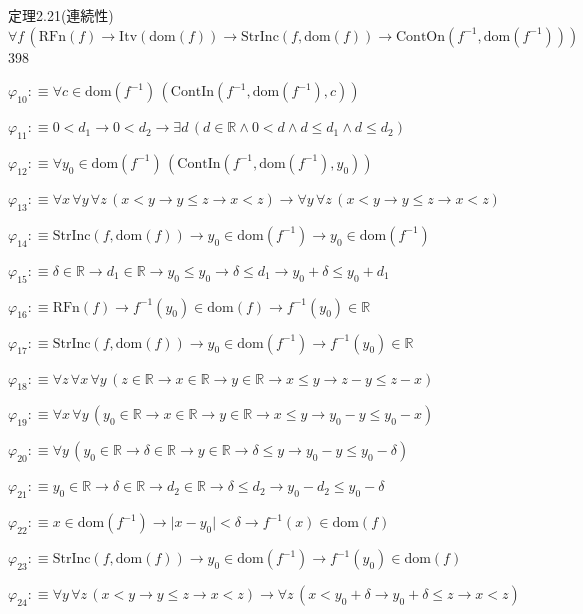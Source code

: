 \begin{fullproof}{定理2.21(連続性)}{$\forall f\,(\mathrm{RFn}(f) \to \mathrm{Itv}(\mathrm{dom}(f)) \to \mathrm{StrInc}(f,\mathrm{dom}(f)) \to \mathrm{ContOn}(f^{-1},\mathrm{dom}(f^{-1})))$}{398}
\begin{abbrevlist}
\item $\varphi_{10} :\equiv \forall c \in \mathrm{dom}(f^{-1})\,(\mathrm{ContIn}(f^{-1},\mathrm{dom}(f^{-1}),c))$
\item $\varphi_{11} :\equiv 0 < d_{1} \to 0 < d_{2} \to \exists d\,(d \in \mathbb{R} \land 0 < d \land d \leq d_{1} \land d \leq d_{2})$
\item $\varphi_{12} :\equiv \forall y_{0} \in \mathrm{dom}(f^{-1})\,(\mathrm{ContIn}(f^{-1},\mathrm{dom}(f^{-1}),y_{0}))$
\item $\varphi_{13} :\equiv \forall x\,\forall y\,\forall z\,(x < y \to y \leq z \to x < z) \to \forall y\,\forall z\,(x < y \to y \leq z \to x < z)$
\item $\varphi_{14} :\equiv \mathrm{StrInc}(f,\mathrm{dom}(f)) \to y_{0} \in \mathrm{dom}(f^{-1}) \to y_{0} \in \mathrm{dom}(f^{-1})$
\item $\varphi_{15} :\equiv \delta \in \mathbb{R} \to d_{1} \in \mathbb{R} \to y_{0} \leq y_{0} \to \delta \leq d_{1} \to y_{0} + \delta \leq y_{0} + d_{1}$
\item $\varphi_{16} :\equiv \mathrm{RFn}(f) \to f^{-1}(y_{0}) \in \mathrm{dom}(f) \to f^{-1}(y_{0}) \in \mathbb{R}$
\item $\varphi_{17} :\equiv \mathrm{StrInc}(f,\mathrm{dom}(f)) \to y_{0} \in \mathrm{dom}(f^{-1}) \to f^{-1}(y_{0}) \in \mathbb{R}$
\item $\varphi_{18} :\equiv \forall z\,\forall x\,\forall y\,(z \in \mathbb{R} \to x \in \mathbb{R} \to y \in \mathbb{R} \to x \leq y \to z - y \leq z - x)$
\item $\varphi_{19} :\equiv \forall x\,\forall y\,(y_{0} \in \mathbb{R} \to x \in \mathbb{R} \to y \in \mathbb{R} \to x \leq y \to y_{0} - y \leq y_{0} - x)$
\item $\varphi_{20} :\equiv \forall y\,(y_{0} \in \mathbb{R} \to \delta \in \mathbb{R} \to y \in \mathbb{R} \to \delta \leq y \to y_{0} - y \leq y_{0} - \delta)$
\item $\varphi_{21} :\equiv y_{0} \in \mathbb{R} \to \delta \in \mathbb{R} \to d_{2} \in \mathbb{R} \to \delta \leq d_{2} \to y_{0} - d_{2} \leq y_{0} - \delta$
\item $\varphi_{22} :\equiv x \in \mathrm{dom}(f^{-1}) \to \lvert x - y_{0} \rvert < \delta \to f^{-1}(x) \in \mathrm{dom}(f)$
\item $\varphi_{23} :\equiv \mathrm{StrInc}(f,\mathrm{dom}(f)) \to y_{0} \in \mathrm{dom}(f^{-1}) \to f^{-1}(y_{0}) \in \mathrm{dom}(f)$
\item $\varphi_{24} :\equiv \forall y\,\forall z\,(x < y \to y \leq z \to x < z) \to \forall z\,(x < y_{0} + \delta \to y_{0} + \delta \leq z \to x < z)$

\end{abbrevlist}
\end{fullproof}
